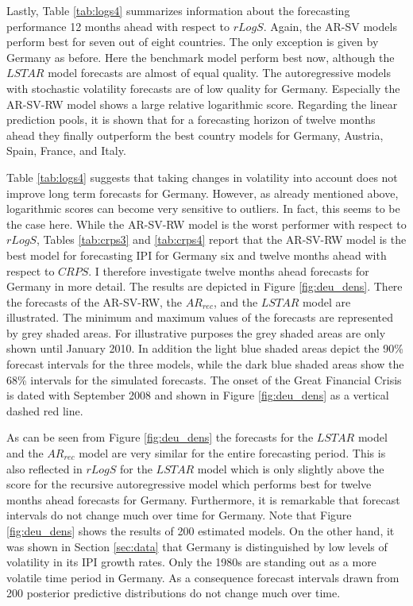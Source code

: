 \documentclass[12pt,letterpaper,fleqn]{article}           %
\begin{document}
Lastly, Table \ref{tab:logs4} summarizes information about the forecasting performance 12 months ahead with respect to $rLogS$. Again, the AR-SV models perform best for seven out of eight countries. The only exception is given by Germany as before. Here the benchmark model perform best now, although the $LSTAR$ model forecasts are almost of equal quality. The autoregressive models with stochastic volatility forecasts are of low quality for Germany. Especially the AR-SV-RW model shows a large relative logarithmic score. Regarding the linear prediction pools, it is shown that for a forecasting horizon of twelve months ahead they finally outperform the best country models for Germany, Austria, Spain, France, and Italy. 

Table \ref{tab:logs4} suggests that taking changes in volatility into account does not improve long term forecasts for Germany. However, as already mentioned above, logarithmic scores can become very sensitive to outliers. In fact, this seems to be the case here. While the AR-SV-RW model is the worst performer with respect to $rLogS$, Tables \ref{tab:crps3} and \ref{tab:crps4} report that the AR-SV-RW model is the best model for forecasting IPI for Germany six and twelve months ahead with respect to $CRPS$. I therefore investigate twelve months ahead forecasts for Germany in more detail. The results are depicted in Figure \ref{fig:deu_dens}. There the forecasts of the AR-SV-RW, the $AR_{rec}$, and the $LSTAR$ model are illustrated. The minimum and maximum values of the forecasts are represented by grey shaded areas. For illustrative purposes the grey shaded areas are only shown until January 2010. In addition the light blue shaded areas depict the 90\% forecast intervals for the three models, while the dark blue shaded areas show the 68\% intervals for the simulated forecasts. The onset of the Great Financial Crisis is dated with September 2008 and shown in Figure \ref{fig:deu_dens} as a vertical dashed red line.

As can be seen from Figure \ref{fig:deu_dens} the forecasts for the $LSTAR$ model and the $AR_{rec}$ model are very similar for the entire forecasting period. This is also reflected in $rLogS$ for the $LSTAR$ model which is only slightly above the score for the recursive autoregressive model which performs best for twelve months ahead forecasts for Germany. Furthermore, it is remarkable that forecast intervals do not change much over time for Germany. Note that Figure \ref{fig:deu_dens} shows the results of 200 estimated models. On the other hand, it was shown in Section \ref{sec:data} that Germany is distinguished by low levels of volatility in its IPI growth rates. Only the 1980s are standing out as a more volatile time period in Germany. As a consequence forecast intervals drawn from 200 posterior predictive distributions do not change much over time.
\end{document}
